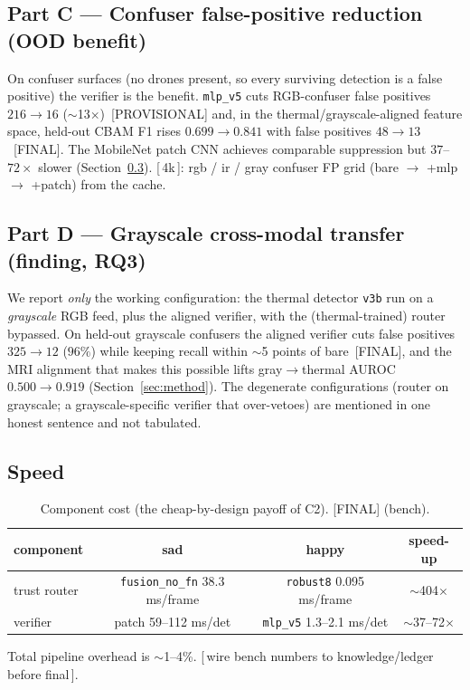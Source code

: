 \documentclass[11pt]{article}
\newcommand{\final}{{\small\textcolor{green!45!black}{[FINAL]}}}
\newcommand{\prov}{{\small\textcolor{orange!80!black}{[PROVISIONAL]}}}
\newcommand{\todo}[1]{{\small\textcolor{red!70!black}{[\,#1\,]}}}
\begin{document}
\subsection{Part C --- Confuser false-positive reduction (OOD benefit)}
\label{sec:partC}
On confuser surfaces (no drones present, so every surviving detection is a false positive) the
verifier is the benefit. \texttt{mlp\_v5} cuts RGB-confuser false positives $216\!\rightarrow\!16$
($\sim$13$\times$)~\prov{} %
and, in the thermal/grayscale-aligned feature space, held-out CBAM F1 rises
$0.699\!\rightarrow\!0.841$ with false positives $48\!\rightarrow\!13$~\final{}. %
The MobileNet patch CNN achieves comparable suppression but $37$--$72\times$ slower (Section~\ref{sec:speed}).
\todo{4k}: rgb / ir / gray confuser FP grid (bare $\rightarrow$ +mlp $\rightarrow$ +patch) from the cache.

\subsection{Part D --- Grayscale cross-modal transfer (finding, RQ3)}
\label{sec:partD}
We report \emph{only} the working configuration: the thermal detector \texttt{v3b} run on a
\emph{grayscale} RGB feed, plus the aligned verifier, with the (thermal-trained) router bypassed.
On held-out grayscale confusers the aligned verifier cuts false positives
$325\!\rightarrow\!12$ ($96\%$) while keeping recall within $\sim$5 points of bare~\final{}, %
and the MRI alignment that makes this possible lifts gray$\rightarrow$thermal AUROC
$0.500\!\rightarrow\!0.919$ (Section~\ref{sec:method}). The degenerate configurations (router on
grayscale; a grayscale-specific verifier that over-vetoes) are mentioned in one honest sentence
and not tabulated.

\subsection{Speed}
\label{sec:speed}
\begin{table}[h]\centering
\caption{Component cost (the cheap-by-design payoff of C2). \final{} (bench).}
\begin{tabular}{lccc}
\toprule
component & sad & happy & speed-up \\
\midrule
trust router  & \texttt{fusion\_no\_fn} 38.3 ms/frame & \texttt{robust8} 0.095 ms/frame & $\sim$404$\times$ \\
verifier      & patch 59--112 ms/det & \texttt{mlp\_v5} 1.3--2.1 ms/det & $\sim$37--72$\times$ \\
\bottomrule
\end{tabular}
\end{table}
\noindent Total pipeline overhead is $\sim$1--4\%. \todo{wire bench numbers to knowledge/ledger before final}.
\end{document}
